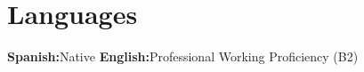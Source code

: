 
\section{Languages}

\ifdefined\cvEnglishAdvanced
\else
  {\small%
    \textbf{Spanish:}\enspace Native\qquad%
    \textbf{English:}\enspace Professional Working Proficiency (B2)%
  }%
\fi

